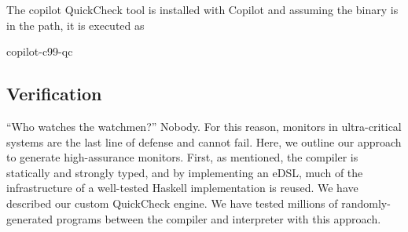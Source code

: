 The copilot QuickCheck tool is installed with Copilot and assuming the binary is
in the path, it is executed as 

\begin{code}
copilot-c99-qc
\end{code}



\subsection{Verification} \label{sec:verification}
``Who watches the watchmen?''  Nobody.  For this reason, monitors in
ultra-critical systems are the last line of defense and cannot fail.  Here, we
outline our approach to generate high-assurance monitors.  First, as mentioned,
the compiler is statically and strongly typed, and by implementing an eDSL, much
of the infrastructure of a well-tested Haskell implementation is reused.  We
have described our custom QuickCheck engine.  We have tested millions of
randomly-generated programs between the compiler and interpreter with this approach.

